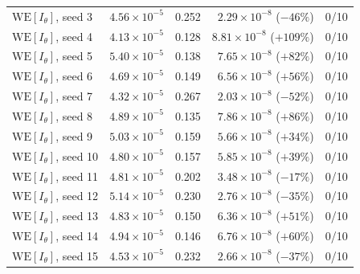 \documentclass[a4paper,fleqn]{cas-sc}
\begin{document}
\begin{table}[H]
\begin{tabular}{lrrrr}
			$\mathrm{WE}[I_\theta]$, seed 3 & $4.56\times10^{-5}$ & 0.252 &
			$2.29\times10^{-8}$ ($-46\%$) & 0/10 \\
			$\mathrm{WE}[I_\theta]$, seed 4 & $4.13\times10^{-5}$ & 0.128 &
			$8.81\times10^{-8}$ ($+109\%$) & 0/10 \\
			$\mathrm{WE}[I_\theta]$, seed 5 & $5.40\times10^{-5}$ & 0.138 &
			$7.65\times10^{-8}$ ($+82\%$) & 0/10 \\
			$\mathrm{WE}[I_\theta]$, seed 6 & $4.69\times10^{-5}$ & 0.149 &
			$6.56\times10^{-8}$ ($+56\%$) & 0/10 \\
			$\mathrm{WE}[I_\theta]$, seed 7 & $4.32\times10^{-5}$ & 0.267 &
			$2.03\times10^{-8}$ ($-52\%$) & 0/10 \\
			$\mathrm{WE}[I_\theta]$, seed 8 & $4.89\times10^{-5}$ & 0.135 &
			$7.86\times10^{-8}$ ($+86\%$) & 0/10 \\
			$\mathrm{WE}[I_\theta]$, seed 9 & $5.03\times10^{-5}$ & 0.159 &
			$5.66\times10^{-8}$ ($+34\%$) & 0/10 \\
			$\mathrm{WE}[I_\theta]$, seed 10 & $4.80\times10^{-5}$ & 0.157 &
			$5.85\times10^{-8}$ ($+39\%$) & 0/10 \\
			$\mathrm{WE}[I_\theta]$, seed 11 & $4.81\times10^{-5}$ & 0.202 &
			$3.48\times10^{-8}$ ($-17\%$) & 0/10 \\
			$\mathrm{WE}[I_\theta]$, seed 12 & $5.14\times10^{-5}$ & 0.230 &
			$2.76\times10^{-8}$ ($-35\%$) & 0/10 \\
			$\mathrm{WE}[I_\theta]$, seed 13 & $4.83\times10^{-5}$ & 0.150 &
			$6.36\times10^{-8}$ ($+51\%$) & 0/10 \\
			$\mathrm{WE}[I_\theta]$, seed 14 & $4.94\times10^{-5}$ & 0.146 &
			$6.76\times10^{-8}$ ($+60\%$) & 0/10 \\
			$\mathrm{WE}[I_\theta]$, seed 15 & $4.53\times10^{-5}$ & 0.232 &
			$2.66\times10^{-8}$ ($-37\%$) & 0/10 \\
			\bottomrule
		\end{tabular}
	\end{table}
	
\end{document}
